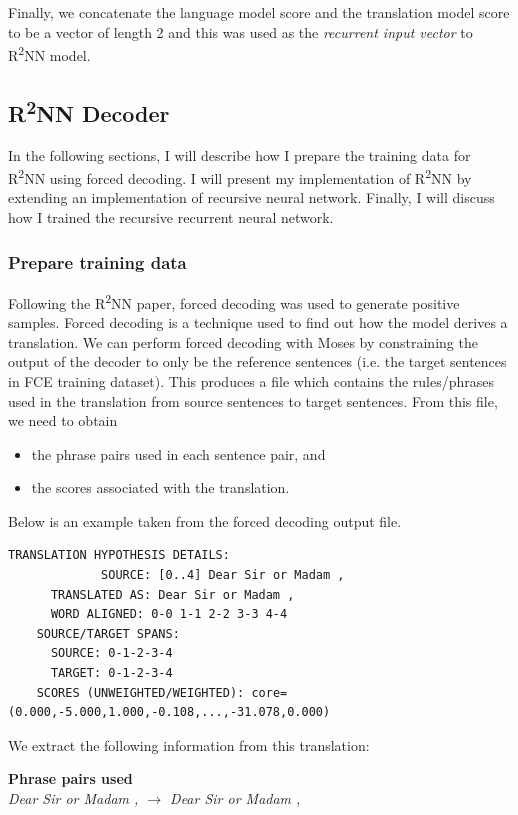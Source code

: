 \documentclass[12pt,a4paper,twoside,openright]{report}
\begin{document}
Finally, we concatenate the language model score and the translation model score to be a vector of length 2 and this was used as the \textit{recurrent input vector} to R\textsuperscript{2}NN model.

\subsection{\texorpdfstring{R\textsuperscript{2}NN}{R2NN} Decoder} \label{section:r2nn_model}
In the following sections, I will describe how I prepare the training data for R\textsuperscript{2}NN using forced decoding. I will present my implementation of R\textsuperscript{2}NN by extending an implementation of recursive neural network. Finally, I will discuss how I trained the recursive recurrent neural network.

\subsubsection{Prepare training data}
Following the R\textsuperscript{2}NN paper\cite{r2nn}, forced decoding was used to generate positive samples. Forced decoding is a technique used to find out how the model derives a translation. We can perform forced decoding with Moses by constraining the output of the decoder to only be the reference sentences (i.e. the target sentences in FCE training dataset). This produces a file which contains the rules/phrases used in the translation from source sentences to target sentences. From this file, we need to obtain
\begin{itemize}
  \item the phrase pairs used in each sentence pair, and
  \item the scores associated with the translation.
\end{itemize}

Below is an example taken from the forced decoding output file.
\begin{lstlisting}[breaklines]
    TRANSLATION HYPOTHESIS DETAILS:
             SOURCE: [0..4] Dear Sir or Madam ,
      TRANSLATED AS: Dear Sir or Madam ,
      WORD ALIGNED: 0-0 1-1 2-2 3-3 4-4 
    SOURCE/TARGET SPANS:
      SOURCE: 0-1-2-3-4
      TARGET: 0-1-2-3-4
    SCORES (UNWEIGHTED/WEIGHTED): core=(0.000,-5.000,1.000,-0.108,...,-31.078,0.000)
\end{lstlisting}

We extract the following information from this translation:

\textbf{Phrase pairs used}\\
\textit{Dear Sir or Madam , $\rightarrow$ Dear Sir or Madam ,}
\end{document}
